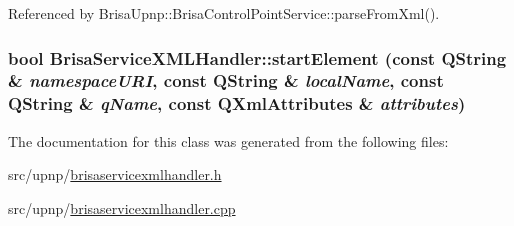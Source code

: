 Referenced by BrisaUpnp::BrisaControlPointService::parseFromXml().\hypertarget{classBrisaUpnp_1_1BrisaServiceXMLHandler_a1bf9047cd3011ff163e654c36ed11966}{
\subsubsection[{startElement}]{\setlength{\rightskip}{0pt plus 5cm}bool BrisaServiceXMLHandler::startElement (const QString \& {\em namespaceURI}, \/  const QString \& {\em localName}, \/  const QString \& {\em qName}, \/  const QXmlAttributes \& {\em attributes})}}
\label{classBrisaUpnp_1_1BrisaServiceXMLHandler_a1bf9047cd3011ff163e654c36ed11966}


The documentation for this class was generated from the following files:\begin{DoxyCompactItemize}
\item 
src/upnp/\hyperlink{brisaservicexmlhandler_8h}{brisaservicexmlhandler.h}\item 
src/upnp/\hyperlink{brisaservicexmlhandler_8cpp}{brisaservicexmlhandler.cpp}\end{DoxyCompactItemize}
